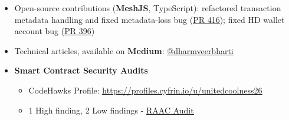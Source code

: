 \documentclass[]{resume-openfont}
\newcommand{\weblink}[2]{\href{#2}{\underline{#1}}}
\begin{document}
\begin{itemize}
    \item Open-source contributions (\textbf{MeshJS}, TypeScript): refactored transaction metadata handling and fixed metadata-loss bug (\weblink{PR 416}{https://github.com/MeshJS/mesh/pull/416}); fixed HD wallet account bug (\weblink{PR 396}{https://github.com/MeshJS/mesh/pull/396})
    \item Technical articles, available on \textbf{Medium}: \weblink{@dharmveerbharti}{https://medium.com/@dharmveerbharti}
    \item \textbf{Smart Contract Security Audits}
    \begin{itemize}
        \item CodeHawks Profile: \weblink{https://profiles.cyfrin.io/u/unitedcoolness26}{https://profiles.cyfrin.io/u/unitedcoolness26}
        \item 1 High finding, 2 Low findings - \weblink{RAAC Audit}{https://codehawks.cyfrin.io/c/2025-02-raac}
    \end{itemize}

\end{itemize}
\end{document}

